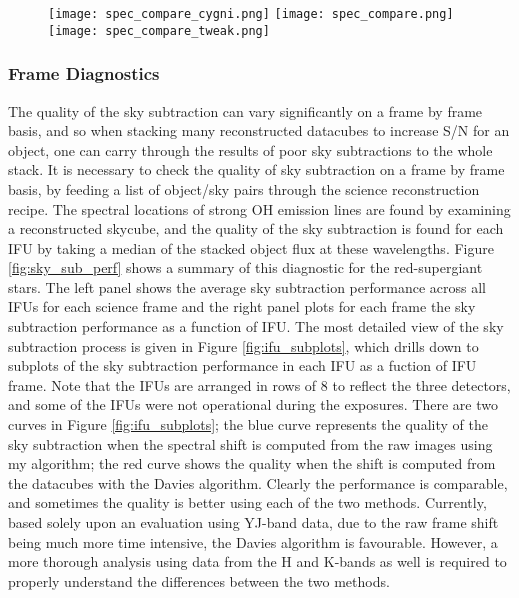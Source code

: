 \documentclass{literature}
\begin{document}
\begin{figure}[!htp]
\centering
\texttt{[image: spec\_compare\_cygni.png]}
\texttt{[image: spec\_compare.png]}
\texttt{[image: spec\_compare\_tweak.png]}
\caption{\footnotesize{\emph{}}}
\label{fig:p_cygni}
\end{figure}

\subsubsection{Frame Diagnostics}\label{frame_diagnostics}
The quality of the sky subtraction can vary significantly on a frame by frame basis, and so when stacking many reconstructed datacubes to increase S/N for an object, one can carry through the results of poor sky subtractions to the whole stack. It is necessary to check the quality of sky subtraction on a frame by frame basis, by feeding a list of object/sky pairs through the science reconstruction recipe. The spectral locations of strong OH emission lines are found by examining a reconstructed skycube, and the quality of the sky subtraction is found for each IFU by taking a median of the stacked object flux at these wavelengths. Figure \ref{fig:sky_sub_perf} shows a summary of this diagnostic for the red-supergiant stars. The left panel shows the average sky subtraction performance across all IFUs for each science frame and the right panel plots for each frame the sky subtraction performance as a function of IFU. The most detailed view of the sky subtraction process is given in Figure \ref{fig:ifu_subplots}, which drills down to subplots of the sky subtraction performance in each IFU as a fuction of IFU frame. Note that the IFUs are arranged in rows of 8 to reflect the three detectors, and some of the IFUs were not operational during the exposures. There are two curves in Figure \ref{fig:ifu_subplots}; the blue curve represents the quality of the sky subtraction when the spectral shift is computed from the raw images using my algorithm; the red curve shows the quality when the shift is computed from the datacubes with the Davies algorithm. Clearly the performance is comparable, and sometimes the quality is better using each of the two methods. Currently, based solely upon an evaluation using YJ-band data, due to the raw frame shift being much more time intensive, the Davies algorithm is favourable. However, a more thorough analysis using data from the H and K-bands as well is required to properly understand the differences between the two methods. \\ 
\end{document}

